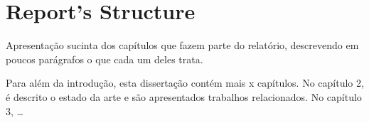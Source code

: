\section{Report's Structure} %
\label{sec:structure}

Apresentação sucinta dos capítulos que fazem parte do relatório, descrevendo em poucos parágrafos o que cada um deles trata.

Para além da introdução, esta dissertação contém mais x capítulos. No capítulo 2, é descrito o estado da arte e são apresentados trabalhos relacionados. No capítulo 3, \ldots

